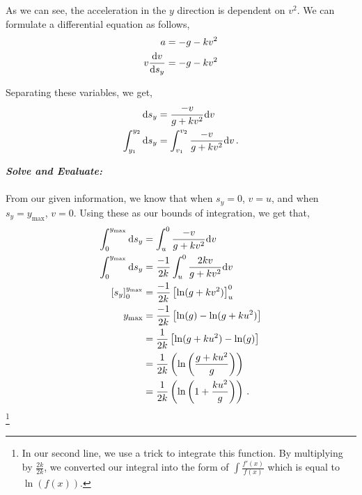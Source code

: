 \begin{subquestions}
As we can see, the acceleration in the $y$ direction is dependent on $v^2$. We can formulate a differential equation as follows,
\begin{align}
	a & = -g -kv^2 \nonumber \\
	v \frac{\mathrm{d}v}{\mathrm{d}s_y} & = -g - kv^2 \nonumber \\
\end{align}

Separating these variables, we get,
\begin{align}
	\mathrm{d} s_y & = \frac{-v}{g+kv^2}\mathrm{d} v \nonumber \\
	\int_{y_1}^{y_2} \mathrm{d} s_y & = \int_{v_1}^{v_2} \frac{-v}{g+kv^2}\mathrm{d} v \,.
\end{align}




\textbf{\textit{Solve and Evaluate:}} \\ \\
From our given information, we know that when $s_y=0$, $v=u$, and when $s_y=y_{\text{max}}$, $v=0$. Using these as our bounds of integration, we get that,
\begin{align}
	\int_{0}^{y_{\text{max}}} \mathrm{d} s_y & = \int_{u}^{0} \frac{-v}{g+kv^2}\mathrm{d} v \nonumber \\
	\int_{0}^{y_{\text{max}}} \mathrm{d} s_y & = \frac{-1}{2k}\int_{u}^{0} \frac{2kv}{g+kv^2}\mathrm{d} v \nonumber \\
	\left[s_y\right]_0^{y_{\text{max}}} & = \frac{-1}{2k} \left[\ln(g+kv^2)\right]_u^0 \nonumber \\
	y_{\text{max}} & = \frac{-1}{2k} \left[\ln(g)-\ln(g+ku^2)\right] \nonumber \\
	               & = \frac{1}{2k} \left[\ln(g+ku^2)-\ln(g)\right] \nonumber \\
	               & = \frac{1}{2k} \left(\ln\left(\frac{g+ku^2}{g}\right)\right) \nonumber \\
	 			   & = \frac{1}{2k} \left(\ln\left(1 + \frac{ku^2}{g}\right)\right) \,.
\end{align} \footnote{In our second line, we use a trick to integrate this function. By multiplying by $\frac{2k}{2k}$, we converted our integral into the form of $\int \frac{f'(x)}{f(x)}$ which is equal to $\ln(f(x))$.} 


\subquestion


\end{subquestions}
